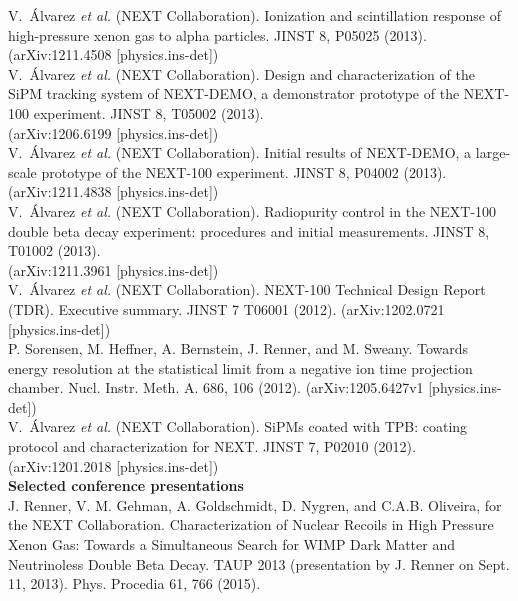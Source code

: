 \noindent V.\ \'{A}lvarez \emph{et al.} (NEXT Collaboration). Ionization and scintillation response of high-pressure xenon gas to alpha particles.
JINST 8, P05025 (2013). (arXiv:1211.4508 [physics.ins-det])\\

\noindent V.\ \'{A}lvarez \emph{et al.} (NEXT Collaboration). Design and characterization of the SiPM tracking system of NEXT-DEMO, a demonstrator prototype of the NEXT-100 experiment.
JINST 8, T05002 (2013).\\(arXiv:1206.6199 [physics.ins-det])\\

\noindent V.\ \'{A}lvarez \emph{et al.} (NEXT Collaboration). Initial results of NEXT-DEMO, a large-scale prototype of the NEXT-100 experiment.
JINST 8, P04002 (2013). (arXiv:1211.4838 [physics.ins-det])\\

\noindent V.\ \'{A}lvarez \emph{et al.} (NEXT Collaboration). Radiopurity control in the NEXT-100 double beta decay experiment: procedures and initial measurements.
JINST 8, T01002 (2013).\\(arXiv:1211.3961 [physics.ins-det])\\

\noindent V.\ \'{A}lvarez \emph{et al.} (NEXT Collaboration). NEXT-100 Technical Design Report (TDR). Executive summary.
JINST 7 T06001 (2012). (arXiv:1202.0721 [physics.ins-det])\\

\noindent P. Sorensen, M. Heffner, A. Bernstein, J. Renner, and M. Sweany. Towards energy resolution at the statistical limit from a negative ion time projection 
chamber. Nucl. Instr. Meth. A. 686, 106 (2012). (arXiv:1205.6427v1 [physics.ins-det])\\

\noindent V.\ \'{A}lvarez \emph{et al.} (NEXT Collaboration). SiPMs coated with TPB: coating protocol and characterization for NEXT.
JINST 7, P02010 (2012). (arXiv:1201.2018 [physics.ins-det])\\

\noindent \textbf{Selected conference presentations}\\

\noindent J. Renner, V. M. Gehman, A. Goldschmidt, D. Nygren, and C.A.B. Oliveira, for the NEXT Collaboration. 
Characterization of Nuclear Recoils in High Pressure Xenon Gas: Towards a Simultaneous Search for WIMP Dark Matter and Neutrinoless 
Double Beta Decay.  TAUP 2013 (presentation by J. Renner on Sept. 11, 2013). Phys. Procedia 61, 766 (2015).\\


